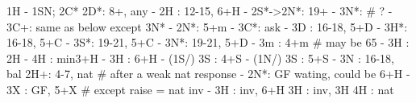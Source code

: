 1H - 1SN; 2C*
2D*: 8+, any
   - 2H : 12-15, 6+H
   - 2S*->2N*: 19+
             - 3N*: # ?
             - 3C+: same as below except 3N*
   - 2N*: 5+m
        - 3C*: ask
            - 3D : 16-18, 5+D
            - 3H*: 16-18, 5+C
            - 3S*: 19-21, 5+C
            - 3N*: 19-21, 5+D
   - 3m : 4+m  # may be 65
        - 3H : 2H
        - 4H : min3+H
   - 3H : 6+H
   - (1S/) 3S : 4+S
   - (1N/) 3S : 5+S
   - 3N : 16-18, bal
2H+: 4-7, nat
# after a weak nat response
   - 2N*: GF wating, could be 6+H
   - 3X : GF, 5+X  # except raise = nat inv
   - 3H : inv, 6+H
3H : inv, 3H
4H : nat